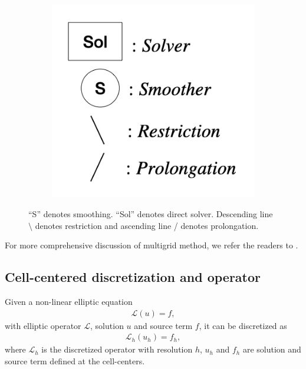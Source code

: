 \begin{figure}[h!]
	\begin{subfigure}{0.2\columnwidth}
		\centering
        \includegraphics[width=\columnwidth]{MG_note.jpeg}
	\end{subfigure}

	\caption[Four different types of four-level cycles in multigrid methods.]{
		``S'' denotes smoothing. ``Sol'' denotes direct solver.
		Descending line $\setminus$ denotes restriction and ascending line / denotes prolongation.
	}
	\label{fig:MG_cycles}
\end{figure}

For more comprehensive discussion of multigrid method,
we refer the readers to \cite{briggs2000multigrid,trottenberg2000multigrid,young2014iterative,brandt2011multigrid}.

\subsection{Cell-centered discretization and operator} %
\label{section3.1.2}
Given a non-linear elliptic equation 
\begin{align}
    \mathcal{L}\left(u\right) = f,
\end{align}
with elliptic operator $\mathcal{L}$, solution $u$ and source term $f$,
it can be discretized as
\begin{align}
    \mathcal{L}_h \left(u_h \right) = f_h,
\end{align}
where $\mathcal{L}_h$ is the discretized operator with resolution $h$,
$u_h$ and $f_h$ are solution and source term defined at the cell-centers.

